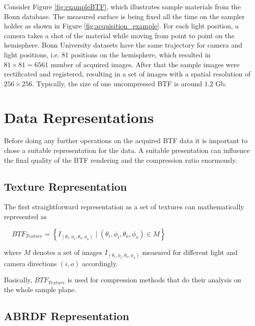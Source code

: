  Consider Figure \ref{fig:exampleBTF}, which illustrates sample materials from the Bonn database.
The measured surface is being fixed all the time on the sampler holder as shown in Figure \ref{fig:acquisition_example}. 
For each light position, a camera takes a shot of the material while moving from point to point on the hemisphere.
Bonn University datasets have the same trajectory for camera and light positions, i.e. 81 positions on the hemisphere, which resulted in $81\times81=6561$ number of acquired images.
After that the sample images were rectificated and registered, resulting in a set of images with a spatial resolution of $256\times256$.
Typically, the size of one uncompressed BTF is around $1.2$ Gb.



\section{Data Representations}
\label{chapter:representations}




Before doing any further operations on the acquired BTF data it is important to chose a suitable representation for the data.
A suitable presentation can influence the final quality of the BTF rendering and the compression ratio enormously.
\subsection{Texture Representation}
\label{chapter:texture_repr}

 The first straightforward representation as a set of textures can mathematically represented as

{\centering $\,\,\,\,\,\,\,BTF_{Texture}=\left \{I_{(\theta_{i} ,\phi_{i},\theta_{o} ,\phi_{o}) }  \mid  (\theta_{i},\phi_{i},\theta_{o} ,\phi_{o})\in M \right \}$\\}


where $M$ denotes a set of images $I_{(\theta_{i} ,\phi_{i},\theta_{o} ,\phi_{o})}$ measured for different light and camera directions $(i,o)$ accordingly.

Basically, $BTF_{Texture}$ is used for compression methods that do their analysis on the whole sample plane.

\subsection{ABRDF Representation}
\label{chapter:abrdf_repr}

